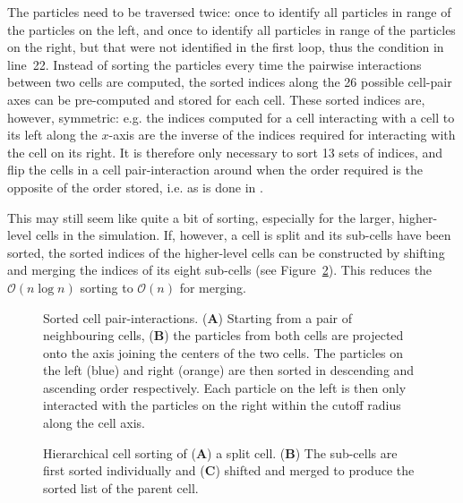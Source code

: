 \documentclass[final]{siamltex}
\newcommand{\oh}[1]
    {\mbox{$ {\mathcal O}( #1 ) $}}
\newcommand{\fig}[1]
    {Figure~\ref{fig:#1}}
\newcommand{\bsf}[1]
    {\textbf{\textsf{#1}}}
\begin{document}
The particles need to be traversed twice: once to identify
all particles in range of the particles on the left, and
once to identify all particles in range of the particles on the
right, but that were not identified in the first loop,
thus the condition in line~22.
Instead of sorting the particles every time the
pairwise interactions between two cells are computed,
the sorted indices along the 26 possible cell-pair axes can be
pre-computed and stored for each cell.
These sorted indices are, however, symmetric: e.g. the indices
computed for a cell interacting with a cell to its left along the
$x$-axis are the inverse of the indices required for interacting 
with the cell on its right.
It is therefore only necessary to sort 13 sets of indices, and flip
the cells in a cell pair-interaction around when the order
required is the opposite of the order stored, i.e. as is
done in \cite{ref:Gonnet2013}.

This may still seem like quite a bit of sorting, especially
for the larger, higher-level cells in the simulation.
If, however, a cell is split and its sub-cells have been sorted,
the sorted indices of the higher-level cells can be constructed
by shifting and merging the indices of its eight sub-cells
(see \fig{HierarchySorting}).
This reduces the \oh{n\log{n}} sorting to \oh{n} for merging. 


\begin{figure}
    \centerline{}
    
    \caption{Sorted cell pair-interactions. ({\bsf A}) Starting from a pair of
        neighbouring cells, ({\bsf B}) the particles from both cells
        are projected onto the axis joining the centers of the two cells.
        The particles on the left (blue) and right (orange) are
        then sorted in descending and ascending order respectively.
        Each particle on the left is then only interacted with
        the particles on the right within the cutoff radius along the cell axis.
        }
    \label{fig:SortedInteractions}
\end{figure}


\begin{figure}
    \centerline{}
    
    \caption{Hierarchical cell sorting of ({\bsf A}) a split cell.
        ({\bsf B}) The sub-cells are first sorted individually and
        ({\bsf C}) shifted and merged to produce the sorted list
        of the parent cell.
        }
    \label{fig:HierarchySorting}
\end{figure}
\end{document}
